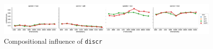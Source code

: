 \begin{figure}
  \centering

  \includegraphics[width=1.1\textwidth]{supplement/figures/compositional-interaction-discr}

  \caption{Compositional influence of \texttt{discr}}
  \label{fig:compositional-discr}
\end{figure}
